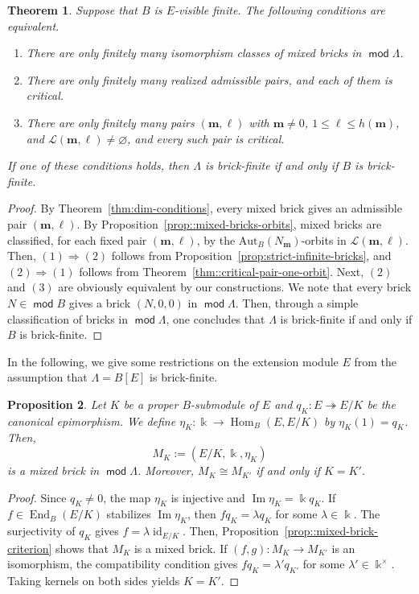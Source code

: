 \documentclass[a4,12pt]{amsart}
\numberwithin{equation}{section} %
\def\Hom{\operatorname{Hom}} %
\def\End{\operatorname{End}} %
\def\Im{\operatorname{Im}} %
\def\mod{\operatorname{\mathsf{mod}}}
\def\Aut{\mathrm{Aut}} %
\newtheorem{theorem}{Theorem}[section] %
\newtheorem{proposition}[theorem]{Proposition} %
\theoremstyle{definition} %
\begin{document}
\begin{theorem}\label{thm:mixed-finite}
Suppose that $B$ is $E$-visible finite. The following conditions are equivalent.
\begin{enumerate}
\item There are only finitely many isomorphism classes of mixed bricks in $\mod \Lambda$.

\item There are only finitely many realized admissible pairs, and each of them is critical.

\item There are only finitely many pairs $(\mathbf{m},\ell)$ with $\mathbf{m}\neq0$, $1\leq\ell\leq h(\mathbf{m})$, and $\mathcal{L}(\mathbf{m},\ell)\neq\varnothing$, and every such pair is critical.
\end{enumerate}
If one of these conditions holds, then $\Lambda$ is brick-finite if and only if $B$ is brick-finite. 
\end{theorem}
\begin{proof}
By Theorem~\ref{thm:dim-conditions}, every mixed brick gives an admissible pair $(\mathbf{m},\ell)$. By Proposition~\ref{prop::mixed-bricks-orbits}, mixed bricks are classified, for each fixed pair $(\mathbf{m},\ell)$, by the $\Aut_B(N_{\mathbf{m}})$-orbits in $\mathcal{L}(\mathbf{m},\ell)$. Then, $(1)\Rightarrow (2)$ follows from Proposition~\ref{prop:strict-infinite-bricks}, and $(2)\Rightarrow (1)$ follows from Theorem~\ref{thm::critical-pair-one-orbit}. Next, $(2)$ and $(3)$ are obviously equivalent by our constructions. 
We note that every brick $N\in\mod B$ gives a brick $(N,0,0)$ in $\mod \Lambda$. Then, through a simple classification of bricks in $\mod \Lambda$, one concludes that $\Lambda$ is brick-finite if and only if $B$ is brick-finite.
\end{proof}

In the following, we give some restrictions on the extension module $E$ from the assumption that $\Lambda=B[E]$ is brick-finite. 

\begin{proposition}\label{prop:quotient-bricks}
Let $K$ be a proper $B$-submodule of $E$ and $q_K\colon E\twoheadrightarrow E/K$ be the canonical epimorphism. We define $\eta_K\colon\Bbbk\longrightarrow\Hom_B(E,E/K)$ by $\eta_K(1)=q_K$. Then,
\[
M_K:=(E/K,\Bbbk,\eta_K)
\]
is a mixed brick in $\mod \Lambda$. Moreover, $M_K\cong M_{K'}$ if and only if $K=K'$.
\end{proposition}
\begin{proof}
Since $q_K\neq0$, the map $\eta_K$ is injective and $\Im\eta_K=\Bbbk q_K$. If
$f\in\End_B(E/K)$ stabilizes $\Im\eta_K$, then $fq_K=\lambda q_K$ for some $\lambda\in\Bbbk$. The surjectivity of $q_K$ gives
$f=\lambda\operatorname{id}_{E/K}$. Then, Proposition~\ref{prop::mixed-brick-criterion} shows that $M_K$ is a
mixed brick. If $(f,g)\colon M_K\to M_{K'}$ is an isomorphism, the compatibility condition gives $fq_K=\lambda' q_{K'}$ for some $\lambda'\in\Bbbk^{\times}$. Taking kernels on both sides yields $K=K'$.
\end{proof}
\end{document}
